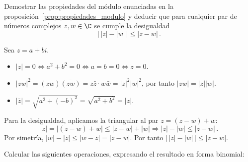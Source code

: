 \begin{questions}
  \question \label{ejer:propiedades_modulo}
  Demostrar las propiedades del módulo enunciadas en la proposición~\ref{prop:propiedades_modulo} y deducir que para cualquier par de números complejos $z,w\in\C$ se cumple la desigualdad
  \[
    \big|\,|z| - |w|\,\big| \leq |z - w|\,.
  \]

  \begin{solution}
    Sea $z=a+bi$.
    \begin{itemize}
      \item $|z|=0 \Leftrightarrow a^2+b^2=0 \Leftrightarrow a=b=0 \Leftrightarrow z=0$.
      \item $|zw|^2 = (zw)\overline{(zw)} = z\bar{z}\cdot w\bar{w} = |z|^2|w|^2$, por tanto $|zw|=|z||w|$.
      \item $|\bar{z}|=\sqrt{a^2+(-b)^2}=\sqrt{a^2+b^2}=|z|$.
    \end{itemize}
    Para la desigualdad, aplicamos la triangular al par $z=(z-w)+w$:
    \[
      |z| = |(z-w)+w| \leq |z-w|+|w| \Rightarrow |z|-|w| \leq |z-w|\,.
    \]
    Por simetría, $|w|-|z|\leq|w-z|=|z-w|$. Por tanto $\big|\,|z|-|w|\,\big|\leq|z-w|$.
  \end{solution}

  \question Calcular las siguientes operaciones, expresando el resultado en forma binomial:

  \begin{solution}
\end{solution}
\end{questions}
